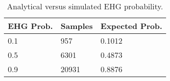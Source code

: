 \begin{table}
\centering
\caption{Analytical versus simulated EHG probability.}
\label{tab:sim_props}
\begin{tabular}{lll}
\toprule
EHG Prob. & Samples & Expected Prob. \\
\midrule
      0.1 &     957 &         0.1012 \\
      0.5 &    6301 &         0.4873 \\
      0.9 &   20931 &         0.8876 \\
\bottomrule
\end{tabular}
\end{table}

